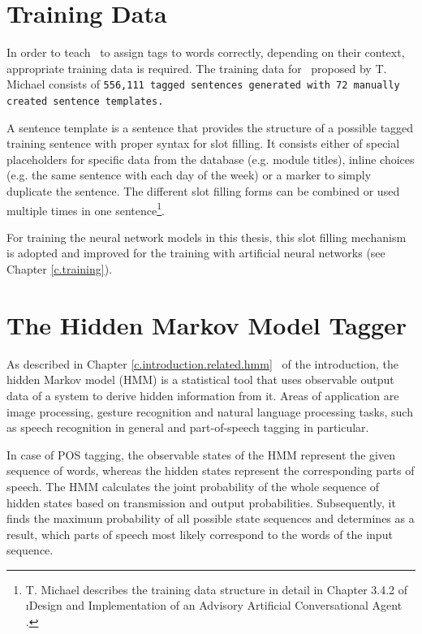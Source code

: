 \section{Training Data}\label{c.alex.data}
In order to teach \Alex\ to assign tags to words correctly, depending on their context, appropriate training data is required. The training data for \Alex\ proposed by T. Michael consists of \tt{556,111} tagged sentences generated with \tt{72} manually created sentence templates.

A sentence template is a sentence that provides the structure of a possible tagged training sentence with proper syntax for slot filling. It consists either of special placeholders for specific data from the database (e.g. module titles), inline choices (e.g. the same sentence with each day of the week) or a marker to simply duplicate the sentence. The different slot filling forms can be combined or used multiple times in one sentence\footnote{T. Michael describes the training data structure in detail in Chapter 3.4.2 of \i{Design and Implementation of an Advisory Artificial Conversational Agent} \cite{michael2016}.}.

For training the neural network models in this thesis, this slot filling mechanism is adopted and improved for the training with artificial neural networks (see Chapter \ref{c.training}).

\section{The Hidden Markov Model Tagger}\label{c.alex.hmm}
As described in Chapter \ref{c.introduction.related.hmm} \ of the introduction, the hidden Markov model (HMM) is a statistical tool that uses observable output data of a system to derive hidden information from it. Areas of application are image processing, gesture recognition and natural language processing tasks, such as speech recognition in general and part-of-speech tagging in particular.

In case of POS tagging, the observable states of the HMM represent the given sequence of words, whereas the hidden states represent the corresponding parts of speech. The HMM calculates the joint probability of the whole sequence of hidden states based on transmission and output probabilities. Subsequently, it finds the maximum probability of all possible state sequences and determines as a result, which parts of speech most likely correspond to the words of the input sequence.

